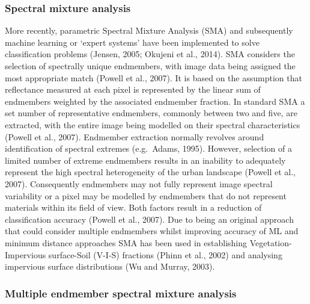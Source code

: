 \documentclass[]{book}
\begin{document}
\subsubsection{Spectral mixture
analysis}\label{spectral-mixture-analysis}

More recently, parametric Spectral Mixture Analysis (SMA) and
subsequently machine learning or `expert systems' have been implemented
to solve classification problems (Jensen, 2005; Okujeni et al., 2014).
SMA considers the selection of spectrally unique endmembers, with image
data being assigned the most appropriate match (Powell et al., 2007). It
is based on the assumption that reflectance measured at each pixel is
represented by the linear sum of endmembers weighted by the associated
endmember fraction. In standard SMA a set number of representative
endmembers, commonly between two and five, are extracted, with the
entire image being modelled on their spectral characteristics (Powell et
al., 2007). Endmember extraction normally revolves around identification
of spectral extremes (e.g.~Adams, 1995). However, selection of a limited
number of extreme endmembers results in an inability to adequately
represent the high spectral heterogeneity of the urban landscape (Powell
et al., 2007). Consequently endmembers may not fully represent image
spectral variability or a pixel may be modelled by endmembers that do
not represent materials within its field of view. Both factors result in
a reduction of classification accuracy (Powell et al., 2007). Due to
being an original approach that could consider multiple endmembers
whilst improving accuracy of ML and minimum distance approaches SMA has
been used in establishing Vegetation-Impervious surface-Soil (V-I-S)
fractions (Phinn et al., 2002) and analysing impervious surface
distributions (Wu and Murray, 2003).

\subsubsection{Multiple endmember spectral mixture
analysis}\label{multiple-endmember-spectral-mixture-analysis}
\end{document}
